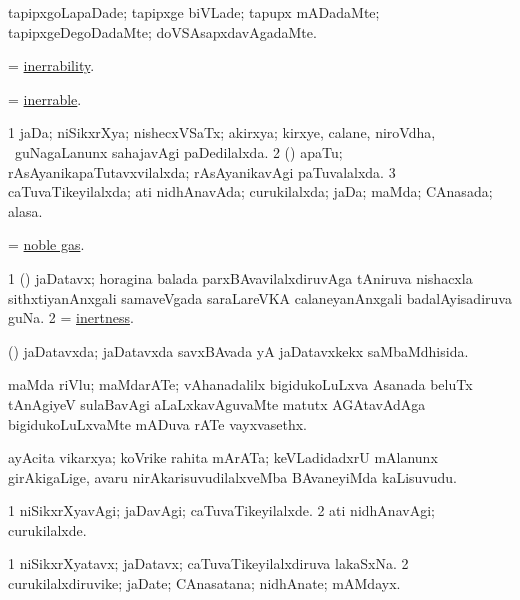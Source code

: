 \bentry
{}
\gl{\kirxvi}
\bmng
tapipxgoLapaDade; tapipxge biVLade; tapupx mADadaMte; tapipxgeDegoDadaMte; doVSAsapxdavAgadaMte. 
\emng
\eentry

\bentry
{}
\gl{\nA}
\bmng
 = \hyperlink{inerrability}{inerrability}. 
\emng
\eentry

\bentry
{}
\gl{\gu}
\bmng
 = \hyperlink{inerrable}{inerrable}. 
\emng
\eentry

\bentry
{}
\gl{\gu}
\bmng
\bnum
\num{1} jaDa; niSikxrXya; nishecxVSaTx; akirxya; kirxye, calane, niroVdha, \mo\ guNagaLanunx sahajavAgi paDedilalxda. 
\num{2} (\ravi) apaTu; rAsAyanikapaTutavxvilalxda; rAsAyanikavAgi paTuvalalxda. 
\num{3} caTuvaTikeyilalxda; ati nidhAnavAda; curukilalxda; jaDa; maMda; CAnasada; alasa. 
\enum
\emng
\eentry

\bentry
{}
\gl{\nA}
\bmng
= \hyperref{kandict_n.pdf}{N}{noble gas}{noble gas}. 
\emng
\eentry

\bentry
{}
\gl{\nA}
\bmng
\bnum
\num{1} (\Bwvi) jaDatavx; horagina balada parxBAvavilalxdiruvAga tAniruva nishacxla sithxtiyanAnxgali samaveVgada saraLareVKA calaneyanAnxgali badalAyisadiruva guNa. 
\num{2}  = \hyperlink{inertness}{inertness}. 
\enum
\emng
\eentry

\bentry
{}
\gl{\gu}
\bmng
(\Bwvi) jaDatavxda; jaDatavxda savxBAvada yA jaDatavxkekx saMbaMdhisida. 
\emng
\eentry

\bentry
{}
\gl{\nA}
\bmng
maMda riVlu; maMdarATe; vAhanadalilx bigidukoLuLxva Asanada beluTx tAnAgiyeV sulaBavAgi aLaLxkavAguvaMte matutx AGAtavAdAga bigidukoLuLxvaMte mADuva rATe vayxvasethx. 
\emng
\eentry

\bentry
{}
\gl{\nA}
\bmng
ayAcita vikarxya; koVrike rahita mArATa; keVLadidadxrU mAlanunx girAkigaLige, avaru nirAkarisuvudilalxveMba BAvaneyiMda kaLisuvudu. 
\emng
\eentry

\bentry
{}
\gl{\kirxvi}
\bmng
\bnum
\num{1} niSikxrXyavAgi; jaDavAgi; caTuvaTikeyilalxde. 
\num{2} ati nidhAnavAgi; curukilalxde. 
\enum
\emng
\eentry

\bentry
{}
\gl{\nA}
\bmng
\bnum
\num{1} niSikxrXyatavx; jaDatavx; caTuvaTikeyilalxdiruva lakaSxNa. 
\num{2} curukilalxdiruvike; jaDate; CAnasatana; nidhAnate; mAMdayx. 
\enum
\emng
\eentry

